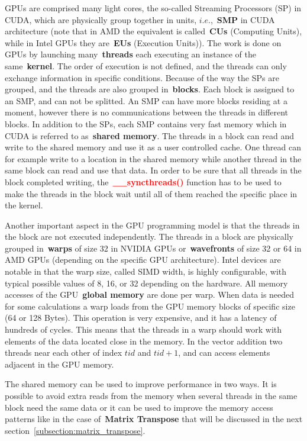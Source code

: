 \par
GPUs are comprised many light cores, the so-called Streaming Processors (SP) in CUDA, which are physically group together in units, $i.e.$,~\textbf{SMP} in CUDA architecture (note that in AMD the equivalent is called~\textbf{CUs} (Computing Units), while in Intel GPUs they are~\textbf{EUs} (Execution Units)).
The work is done on GPUs by launching many~\textbf{threads} each executing an instance of the same~\textbf{kernel}.
The order of execution is not defined, and the threads can only exchange information in specific conditions.
Because of the way the SPs are grouped, and the threads are also grouped in~\textbf{blocks}.
Each block is assigned to an SMP, and can not be splitted.
An SMP can have more blocks residing at a moment, however there is no communications between the threads in different blocks.
In addition to the SPs, each SMP contains very fast memory which in CUDA is referred to as~\textbf{shared memory}.
The threads in a block can read and write to the shared memory and use it as a user controlled cache.
One thread can for example write to a location in the shared memory while another thread in the same block can read and use that data.
In order to be sure that all threads in the block completed writing, the~\textbf{\textcolor{red}{\_\_syncthreads()}} function has to be used to make the threads in the block wait until all of them reached the specific place in the kernel.


\par
Another important aspect in the GPU programming model is that the threads in the block are not executed independently.
The threads in a block are physically grouped in~\textbf{warps} of size 32 in NVIDIA GPUs or~\textbf{wavefronts} of size 32 or 64 in AMD GPUs (depending on the specific GPU architecture).
Intel devices are notable in that the warp size, called SIMD width, is highly configurable, with typical possible values of 8, 16, or 32 depending on the hardware.
All memory accesses of the GPU~\textbf{global memory} are done per warp.
When data is needed for some calculations a warp loads from the GPU memory blocks of specific size (64 or 128 Bytes).
This operation is very expensive, and it has a latency of hundreds of cycles. 
This means that the threads in a warp should work with elements of the data located close in the memory.
In the vector addition two threads near each other of index $tid$ and $tid+1$, and can access elements adjacent in the GPU memory.


\par
The shared memory can be used to improve performance in two ways.
It is possible to avoid extra reads from the memory when several threads in the same block need the same data or it can be used to improve the memory access patterns like in the case of~\textbf{Matrix Transpose} that will be discussed in the next section~\ref{subsection:matrix_transpose}.


